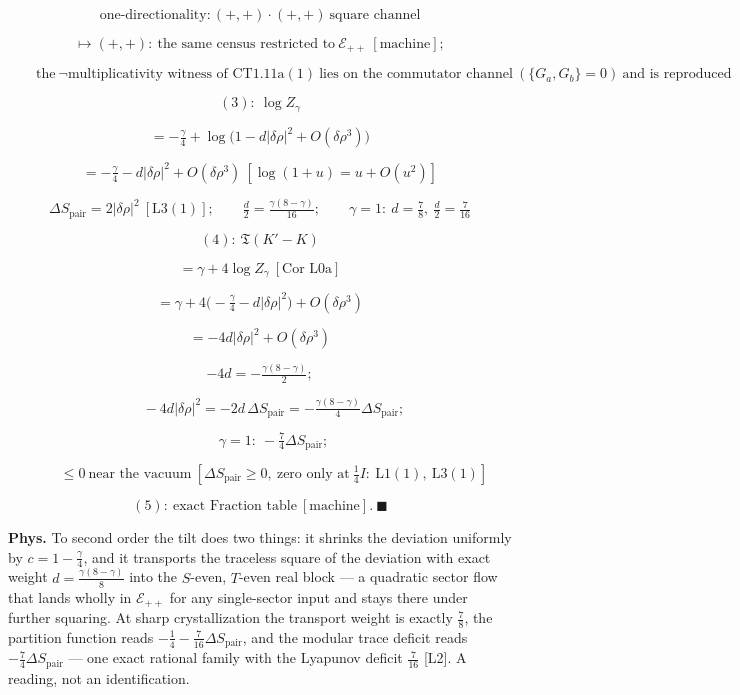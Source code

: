 \begin{theorem}
\[
\text{one-directionality}: (+,+)\cdot(+,+)\ \text{square channel}
\]

\[
\mapsto (+,+):\ \text{the same census restricted to}\ \mathcal E_{++}\ [\text{machine}];
\]

\[
\qquad \text{the}\ \neg\text{multiplicativity witness of CT1.11a}(1)\ \text{lies on the commutator channel}\ (\{G_a,G_b\}=0)\ \text{and is reproduced}
\]

\[
(3):\ \log Z_\gamma
\]

\[
= -\tfrac\gamma4+\log\bigl(1-d|\delta\rho|^2+O(\delta\rho^3)\bigr)
\]

\[
= -\tfrac\gamma4-d|\delta\rho|^2+O(\delta\rho^3)\ [\log(1+u)=u+O(u^2)]
\]

\[
\Delta S_{\mathrm{pair}}=2|\delta\rho|^2\ [\mathrm{L3}(1)];\qquad\tfrac d2=\tfrac{\gamma(8-\gamma)}{16};\qquad\gamma=1:\ d=\tfrac78,\ \tfrac d2=\tfrac7{16}
\]

\[
(4):\ \mathfrak T(K'-K)
\]

\[
= \gamma+4\log Z_\gamma\ [\text{Cor L0a}]
\]

\[
= \gamma+4\bigl(-\tfrac\gamma4-d|\delta\rho|^2\bigr)+O(\delta\rho^3)
\]

\[
= -4d|\delta\rho|^2+O(\delta\rho^3)
\]

\[
-4d=-\tfrac{\gamma(8-\gamma)}2;
\]

\[
\qquad -4d|\delta\rho|^2=-2d\,\Delta S_{\mathrm{pair}}=-\tfrac{\gamma(8-\gamma)}4\Delta S_{\mathrm{pair}};
\]

\[
\qquad \gamma=1:\ -\tfrac74\Delta S_{\mathrm{pair}};
\]

\[
\qquad \le0\ \text{near the vacuum}\ [\Delta S_{\mathrm{pair}}\ge0,\ \text{zero only at}\ \tfrac14I:\ \mathrm{L1}(1),\ \mathrm{L3}(1)]
\]

\[
(5):\ \text{exact Fraction table}\ [\text{machine}].\ \blacksquare
\]

\textbf{Phys.} To second order the tilt does two things: it shrinks the deviation uniformly by $c=1-\tfrac\gamma4$, and it transports the traceless square of the deviation with exact weight $d=\tfrac{\gamma(8-\gamma)}8$ into the $S$-even, $T$-even real block — a quadratic sector flow that lands wholly in $\mathcal E_{++}$ for any single-sector input and stays there under further squaring. At sharp crystallization the transport weight is exactly $\tfrac78$, the partition function reads $-\tfrac14-\tfrac7{16}\Delta S_{\mathrm{pair}}$, and the modular trace deficit reads $-\tfrac74\Delta S_{\mathrm{pair}}$ — one exact rational family with the Lyapunov deficit $\tfrac7{16}$ [L2]. A reading, not an identification.

\end{theorem}

